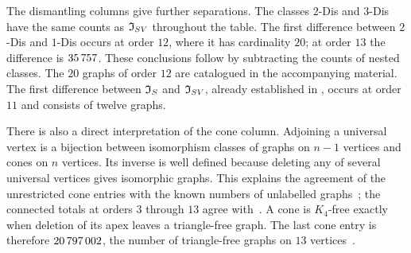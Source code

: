 The dismantling columns give further separations. The classes
$2$-Dis and $3$-Dis have the same counts as $\mathfrak I_{SV}$ throughout the
table. The first difference between $2$-Dis and $1$-Dis occurs at
order $12$, where it has cardinality $20$; at order $13$ the
difference is $\num{35757}$. These conclusions
follow by subtracting the counts of nested classes. The $20$ graphs
of order $12$ are catalogued in the accompanying material. The first
difference between $\mathfrak I_S$ and $\mathfrak I_{SV}$, already established in
\cite[Theorem~11]{DEFH2023}, occurs at order $11$ and consists of
twelve graphs.

There is also a direct interpretation of the cone column. Adjoining
a universal vertex is a bijection between isomorphism classes of
graphs on $n-1$ vertices and cones on $n$ vertices. Its inverse is
well defined because deleting any of several universal vertices
gives isomorphic graphs. This explains the agreement of the
unrestricted cone entries with the known numbers of unlabelled
graphs~\cite{OEISA000088}; the connected totals at orders $3$ through
$13$ agree with~\cite{OEISA001349}. A cone is $K_4$-free exactly when deletion
of its apex leaves a triangle-free graph. The last cone entry is
therefore $\num{20797002}$, the number of triangle-free graphs
on $13$ vertices~\cite{OEISA006785}.
